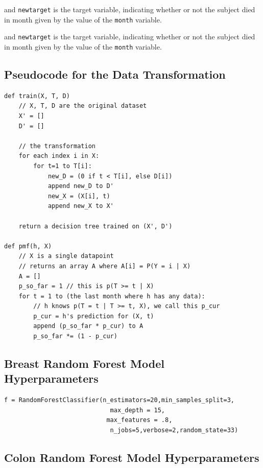 \documentclass[10pt,letterpaper]{article}
\newcommand{\codewhite}[1]{\colorbox{white}{\texttt{#1}}}
\begin{document}
and 
\codewhite{newtarget} is the target variable, indicating whether or not the subject died in month given by the value of the \codewhite{month} variable.




and 
\codewhite{newtarget} is the target variable, indicating whether or not the subject died in month given by the value of the \codewhite{month} variable.


\subsection*{Pseudocode for the Data Transformation}
\label{subsec:pseudocode}

\begin{verbatim}
def train(X, T, D)
    // X, T, D are the original dataset
    X' = []
    D' = []

    // the transformation
    for each index i in X:
        for t=1 to T[i]:
            new_D = (0 if t < T[i], else D[i])
            append new_D to D'
            new_X = (X[i], t)
            append new_X to X'

    return a decision tree trained on (X', D')

def pmf(h, X)
    // X is a single datapoint
    // returns an array A where A[i] = P(Y = i | X)
    A = []
    p_so_far = 1 // this is p(T >= t | X)
    for t = 1 to (the last month where h has any data):
        // h knows p(T = t | T >= t, X), we call this p_cur
        p_cur = h's prediction for (X, t)
        append (p_so_far * p_cur) to A
        p_so_far *= (1 - p_cur)

\end{verbatim}

\subsection*{Breast Random Forest Model Hyperparameters}
\label{subsec:breastrf}

\begin{verbatim}
f = RandomForestClassifier(n_estimators=20,min_samples_split=3,
                             max_depth = 15,
                            max_features = .8,
                             n_jobs=5,verbose=2,random_state=33)
\end{verbatim}




\subsection*{Colon Random Forest Model Hyperparameters}
\label{subsec:colonrf}
\end{document}
